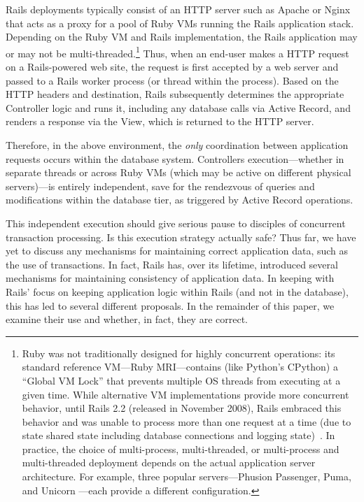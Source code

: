 Rails deployments typically consist of an HTTP server such as Apache or Nginx that acts as a proxy for a pool of Ruby VMs running the Rails application stack. Depending on the Ruby VM and Rails implementation, the Rails application may or may not be multi-threaded.\footnote{Ruby was not traditionally designed for highly concurrent operations: its standard reference VM---Ruby MRI---contains (like Python's CPython) a ``Global VM Lock'' that prevents multiple OS threads from executing at a given time. While alternative VM implementations provide more concurrent behavior, until Rails 2.2 (released in November 2008), Rails embraced this behavior and was unable to process more than one request at a time (due to state shared state including database connections and logging state)~\cite{rails-threading}. In practice, the choice of multi-process, multi-threaded, or multi-process and multi-threaded deployment depends on the actual application server architecture. For example, three popular servers---Phusion Passenger, Puma, and Unicorn ---each provide a different configuration.} Thus, when an end-user makes a HTTP request on a Rails-powered web site, the request is first accepted by a web server and passed to a Rails worker process (or thread within the process). Based on the HTTP headers and destination, Rails subsequently determines the appropriate Controller logic and runs it, including any database calls via Active Record, and renders a response via the View, which is returned to the HTTP server.

Therefore, in the above environment, the \textit{only} coordination between application requests occurs within the database system. Controllers execution---whether in separate threads or across Ruby VMs (which may be active on different physical servers)---is entirely independent, save for the rendezvous of queries and modifications within the database tier, as triggered by Active Record operations.

This independent execution should give serious pause to disciples of concurrent transaction processing. Is this execution strategy actually safe? Thus far, we have yet to discuss any mechanisms for maintaining correct application data, such as the use of transactions. In fact, Rails has, over its lifetime, introduced several mechanisms for maintaining consistency of application data. In keeping with Rails' focus on keeping application logic within Rails (and not in the database), this has led to several different proposals. In the remainder of this paper, we examine their use and whether, in fact, they are correct.



